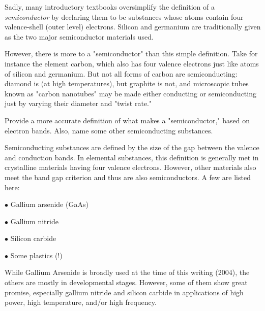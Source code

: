 

Sadly, many introductory textbooks oversimplify the definition of a {\it semiconductor} by declaring them to be substances whose atoms contain four valence-shell (outer level) electrons.  Silicon and germanium are traditionally given as the two major semiconductor materials used.

However, there is more to a "semiconductor" than this simple definition.  Take for instance the element carbon, which also has four valence electrons just like atoms of silicon and germanium.  But not all forms of carbon are semiconducting: diamond is (at high temperatures), but graphite is not, and microscopic tubes known as "carbon nanotubes" may be made either conducting or semiconducting just by varying their diameter and "twist rate."

Provide a more accurate definition of what makes a "semiconductor," based on electron bands.  Also, name some other semiconducting substances.







Semiconducting substances are defined by the size of the gap between the valence and conduction bands.  In elemental substances, this definition is generally met in crystalline materials having four valence electrons.  However, other materials also meet the band gap criterion and thus are also semiconductors.  A few are listed here:

\medskip
\item{$\bullet$} Gallium arsenide (GaAs)
\item{$\bullet$} Gallium nitride
\item{$\bullet$} Silicon carbide
\item{$\bullet$} Some plastics (!)
\medskip

While Gallium Arsenide is broadly used at the time of this writing (2004), the others are mostly in developmental stages.  However, some of them show great promise, especially gallium nitride and silicon carbide in applications of high power, high temperature, and/or high frequency.






